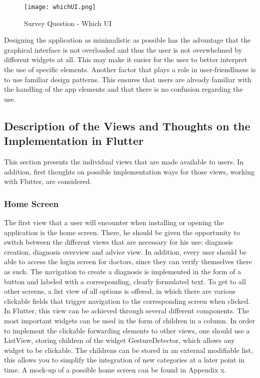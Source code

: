 \begin{figure}[H]
	\centering
	\texttt{[image: whichUI.png]}
	\caption[Survey Question]{Survey Question - Which UI}
\end{figure}
\noindent
Designing the application as minimalistic as possible has the advantage that the graphical interface is not overloaded and thus the user is not overwhelmed by different widgets at all. This may make it easier for the user to better interpret the use of specific elements. Another factor that plays a role in user-friendliness is to use familiar design patterns. This ensures that users are already familiar with the handling of the app elements and that there is no confusion regarding the use. 

\subsection{Description of the Views and Thoughts on the Implementation in Flutter}
This section presents the individual views that are made available to users. In addition, first thoughts on possible implementation ways for those views, working with Flutter, are considered.
\subsubsection{\textbf{Home Screen}}
The first view that a user will encounter when installing or opening the application is the home screen. There, he should be given the opportunity to switch between the different views that are necessary for his use: diagnosis creation, diagnosis overview and advice view. In addition, every user should be able to access the login screen for doctors, since they can verify themselves there as such. The navigation to create a diagnosis is implemented in the form of a button and labeled with a corresponding, clearly formulated text. To get to all other screens, a list view of all options is offered, in which there are various clickable fields that trigger navigation to the corresponding screen when clicked. In Flutter, this view can be achieved through several different components. The most important widgets can be used in the form of children in a column. In order to implement the clickable forwarding elements to other views, one should use a ListView, storing children of the widget GestureDetector, which allows any widget to be clickable. The childrens can be stored in an external modifiable list, this allows you to simplify the integration of new categories at a later point in time. A mock-up of a possible home screen can be found in Appendix x.

